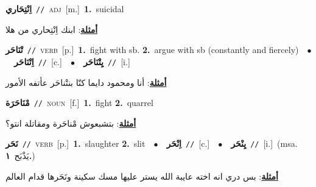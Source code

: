 \documentclass[10pt,a4paper,twoside]{article} %
\begin{document}
\begin{multicols}{2}
{\setlength\topsep{0pt}\textbf{\foreignlanguage{arabic}{اِنْتِحَاري}}\ {\color{gray}\texttt{//}\color{black}}\ \textsc{adj}\ [m.]\ \textbf{1.}~suicidal\  \begin{flushright}\color{gray}\foreignlanguage{arabic}{\textbf{\underline{\foreignlanguage{arabic}{أمثلة}}}: ابنك اِنْتِحاري من هلا}\end{flushright}\color{black}} \vspace{2mm}

{\setlength\topsep{0pt}\textbf{\foreignlanguage{arabic}{تْنَاحَر}}\ {\color{gray}\texttt{//}\color{black}}\ \textsc{verb}\ [p.]\ \textbf{1.}~fight with sb.  \textbf{2.}~argue with sb (constantly and fiercely)\ \ $\bullet$\ \ \setlength\topsep{0pt}\textbf{\foreignlanguage{arabic}{اِتْنَاحَر}}\ {\color{gray}\texttt{//}\color{black}}\ [c.]\ \ $\bullet$\ \ \setlength\topsep{0pt}\textbf{\foreignlanguage{arabic}{يِتْنَاحَر}}\ {\color{gray}\texttt{//}\color{black}}\ [i.]\  \begin{flushright}\color{gray}\foreignlanguage{arabic}{\textbf{\underline{\foreignlanguage{arabic}{أمثلة}}}: أنا ومحمود دايما كنّا بنتْناحَر عأتفه الأمور}\end{flushright}\color{black}} \vspace{2mm}

{\setlength\topsep{0pt}\textbf{\foreignlanguage{arabic}{مْنَاحَرَة}}\ {\color{gray}\texttt{//}\color{black}}\ \textsc{noun}\ [f.]\ \textbf{1.}~fight  \textbf{2.}~quarrel\  \begin{flushright}\color{gray}\foreignlanguage{arabic}{\textbf{\underline{\foreignlanguage{arabic}{أمثلة}}}: بتشبعوش مْناحَرة ومقاتلة انتو؟}\end{flushright}\color{black}} \vspace{2mm}

{\setlength\topsep{0pt}\textbf{\foreignlanguage{arabic}{نَحَر}}\ {\color{gray}\texttt{//}\color{black}}\ \textsc{verb}\ [p.]\ \textbf{1.}~slaughter  \textbf{2.}~slit\ \ $\bullet$\ \ \setlength\topsep{0pt}\textbf{\foreignlanguage{arabic}{اِنْحَر}}\ {\color{gray}\texttt{//}\color{black}}\ [c.]\ \ $\bullet$\ \ \setlength\topsep{0pt}\textbf{\foreignlanguage{arabic}{يِنْحَر}}\ {\color{gray}\texttt{//}\color{black}}\ [i.]\ \color{gray}(msa. \foreignlanguage{arabic}{يَذْبَح}~\foreignlanguage{arabic}{\textbf{١.}})\color{black}\  \begin{flushright}\color{gray}\foreignlanguage{arabic}{\textbf{\underline{\foreignlanguage{arabic}{أمثلة}}}: بس دري انه اخته عايبة الله يستر عليها مسك سكينة ونَحَرها قدام العالم}\end{flushright}\color{black}} \vspace{2mm}


\end{multicols}
\end{document}

